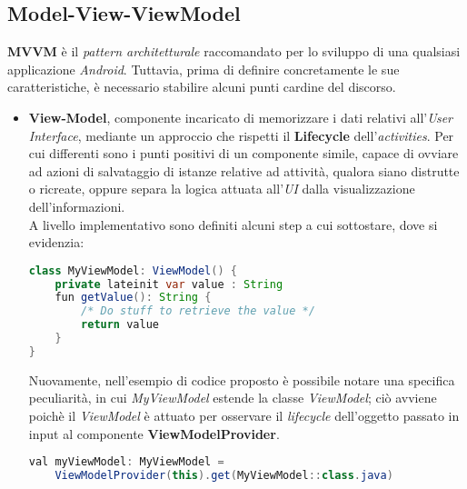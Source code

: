\documentclass{article}
\begin{document}
\subsection*{Model-View-ViewModel}
\textbf{MVVM} è il \textit{pattern architetturale} raccomandato per lo sviluppo di una qualsiasi applicazione \textit{Android}. Tuttavia, prima di definire concretamente le sue caratteristiche, è necessario stabilire alcuni punti cardine del discorso.
\begin{itemize}[label = {-}]
    \itemsep0em
    \item \textbf{View-Model}, componente incaricato di memorizzare i dati relativi all'\textit{User Interface}, mediante un approccio che rispetti il \textbf{Lifecycle} dell'\textit{activities}. Per cui differenti sono i punti positivi di un componente simile, capace di ovviare ad azioni di salvataggio di istanze relative ad attività, qualora siano distrutte o ricreate, oppure separa la logica attuata all'\textit{UI} dalla visualizzazione dell'informazioni.\vspace*{7pt}\\
    A livello implementativo sono definiti alcuni step a cui sottostare, dove si evidenzia:
    \begin{lstlisting}[language = JAVA]
class MyViewModel: ViewModel() {
    private lateinit var value : String
    fun getValue(): String {
        /* Do stuff to retrieve the value */
        return value
    }
}
    \end{lstlisting}
    Nuovamente, nell'esempio di codice proposto è possibile notare una specifica peculiarità, in cui \textit{MyViewModel} estende la classe \textit{ViewModel}; ciò avviene poichè il \textit{ViewModel} è attuato per osservare il \textit{lifecycle} dell'oggetto passato in input al componente \textbf{ViewModelProvider}.
    \begin{lstlisting}[language = JAVA]
val myViewModel: MyViewModel =
    ViewModelProvider(this).get(MyViewModel::class.java)


\end{lstlisting}
\end{itemize}
\end{document}
